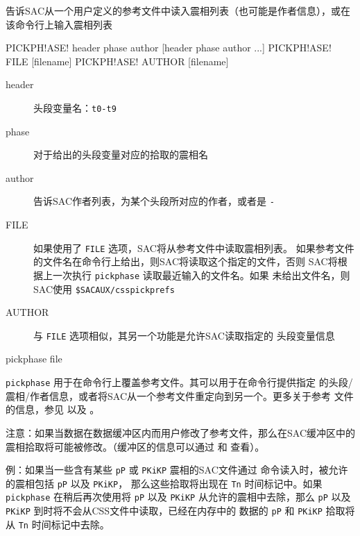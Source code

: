 \label{cmd:pickphase}

告诉SAC从一个用户定义的参考文件中读入震相列表（也可能是作者信息），或在
该命令行上输入震相列表

\begin{SACSTX}
PICKPH!ASE! header phase author [header phase author ...]
PICKPH!ASE! FILE [filename]
PICKPH!ASE! AUTHOR [filename]
\end{SACSTX}

\begin{description}
\item [header] 头段变量名：\texttt{t0-t9}
\item [phase] 对于给出的头段变量对应的拾取的震相名
\item [author] 告诉SAC作者列表，为某个头段所对应的作者，或者是 \texttt{-}
\item [FILE] 如果使用了 \texttt{FILE} 选项，SAC将从参考文件中读取震相列表。
    如果参考文件的文件名在命令行上给出，则SAC将读取这个指定的文件，否则
    SAC将根据上一次执行 \texttt{pickphase} 读取最近输入的文件名。如果
    未给出文件名，则SAC使用 \verb|$SACAUX/csspickprefs|
\item [AUTHOR] 与 \texttt{FILE} 选项相似，其另一个功能是允许SAC读取指定的
    头段变量信息
\end{description}

\begin{SACDFT}
pickphase file
\end{SACDFT}

\texttt{pickphase} 用于在命令行上覆盖参考文件。其可以用于在命令行提供指定
的头段/震相/作者信息，或者将SAC从一个参考文件重定向到另一个。更多关于参考
文件的信息，参见  以及 。

注意：如果当数据在数据缓冲区内而用户修改了参考文件，那么在SAC缓冲区中的
震相拾取将可能被修改。（缓冲区的信息可以通过  和
 查看）。

例：如果当一些含有某些 \texttt{pP} 或 \texttt{PKiKP} 震相的SAC文件通过
 命令读入时，被允许的震相包括 \texttt{pP} 以及 \texttt{PKiKP}，
那么这些拾取将出现在 \texttt{Tn} 时间标记中。如果 \texttt{pickphase}
在稍后再次使用将 \texttt{pP} 以及 \texttt{PKiKP} 从允许的震相中去除，那么
\texttt{pP} 以及 \texttt{PKiKP} 到时将不会从CSS文件中读取，已经在内存中的
数据的 \texttt{pP} 和 \texttt{PKiKP} 拾取将从 \texttt{Tn}  时间标记中去除。
